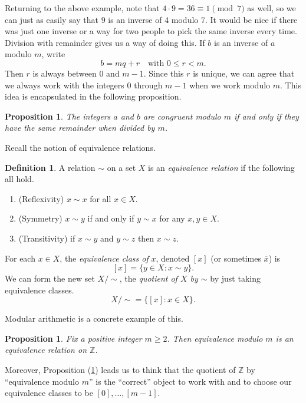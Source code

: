 \documentclass[12pt]{article}
\theoremstyle{plain}
\newtheorem{proposition}[theorem]{Proposition}
\theoremstyle{definition}
\newtheorem{definition}[theorem]{Definition}
\theoremstyle{remark}
\newcommand{\Z}{\mathbb{Z}}
\begin{document}
Returning to the above example, note that $4\cdot 9 = 36 \equiv 1\pmod 7$ as well, so we can just as easily say that $9$ is an inverse of 4 modulo 7.
It would be nice if there was just one inverse or a way for two people to pick the same inverse every time.
Division with remainder gives us a way of doing this.
If $b$ is an inverse of $a$ modulo $m$, write
\[
    b = mq + r\quad\text{with }0\leq r < m.
\]
Then $r$ is always between 0 and $m-1$. Since this $r$ is unique, we can agree that we always work with the integers 0 through $m-1$ when we work modulo $m$.
This idea is encapsulated in the following proposition.

\begin{proposition}\label{remainders only}
    The integers $a$ and $b$ are congruent modulo $m$ if and only if they have the same remainder when divided by $m$.
\end{proposition}

Recall the notion of equivalence relations.

\begin{definition}
    A relation $\sim$ on a set $X$ is an \emph{equivalence relation} if the following all hold.
    \begin{enumerate}
        \item (Reflexivity) $x\sim x$ for all $x\in X$.
        \item (Symmetry) $x\sim y$ if and only if $y\sim x$ for any $x,y\in X$.
        \item (Transitivity) if $x\sim y$ and $y\sim z$ then $x\sim z$.
    \end{enumerate}
    For each $x\in X$, the \emph{equivalence class of }$x$, denoted $[x]$ (or sometimes $\overline{x}$) is
    \[
        [x] = \{y\in X: x\sim y\}.
    \]
    We can form the new set $X/\sim$, the \emph{quotient of $X$ by $\sim$} by just taking equivalence classes.
    \[
        X/\sim = \{[x]: x\in X\}.
    \]
\end{definition}

Modular arithmetic is a concrete example of this.

\begin{proposition}
    Fix a positive integer $m\geq 2$. Then equivalence modulo $m$ is an equivalence relation on $\Z$.
\end{proposition}

Moreover, Proposition (\ref{remainders only}) leads us to think that the quotient of $\Z$ by ``equivalence modulo $m$'' is the ``correct'' object to work with and to choose our equivalence classes to be $[0], \ldots, [m-1]$.
\end{document}
